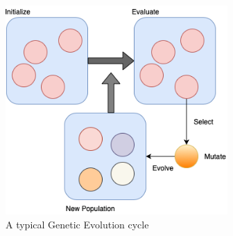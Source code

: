 \begin{figure}[t]
    \centering
    \includegraphics[width=0.7\linewidth, height=8cm]{BachelorMasterThesis/TheoreticalBackground/Figures/Evolution_Cycle.png}
    \caption{A typical Genetic Evolution cycle}
    \label{fig:genetic_evolution_cycle}
\end{figure}

